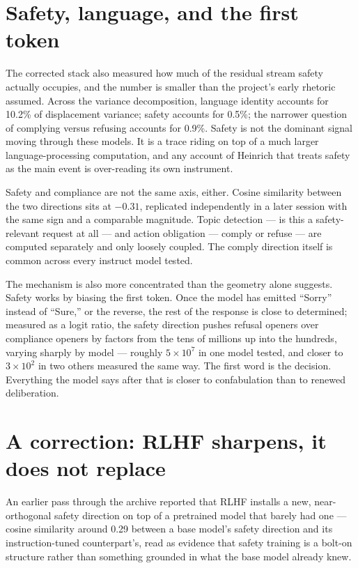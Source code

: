 \documentclass[11pt,oneside]{book}
\begin{document}
\section{Safety, language, and the first token}
The corrected stack also measured how much of the residual stream safety actually occupies, and the number is smaller than the project's early rhetoric assumed. Across the variance decomposition, language identity accounts for 10.2\% of displacement variance; safety accounts for 0.5\%; the narrower question of complying versus refusing accounts for 0.9\%. Safety is not the dominant signal moving through these models. It is a trace riding on top of a much larger language-processing computation, and any account of Heinrich that treats safety as the main event is over-reading its own instrument.

Safety and compliance are not the same axis, either. Cosine similarity between the two directions sits at $-0.31$, replicated independently in a later session with the same sign and a comparable magnitude. Topic detection --- is this a safety-relevant request at all --- and action obligation --- comply or refuse --- are computed separately and only loosely coupled. The comply direction itself is common across every instruct model tested.

The mechanism is also more concentrated than the geometry alone suggests. Safety works by biasing the first token. Once the model has emitted ``Sorry'' instead of ``Sure,'' or the reverse, the rest of the response is close to determined; measured as a logit ratio, the safety direction pushes refusal openers over compliance openers by factors from the tens of millions up into the hundreds, varying sharply by model --- roughly $5\times10^7$ in one model tested, and closer to $3\times10^2$ in two others measured the same way. The first word is the decision. Everything the model says after that is closer to confabulation than to renewed deliberation.

\section{A correction: RLHF sharpens, it does not replace}
An earlier pass through the archive reported that RLHF installs a new, near-orthogonal safety direction on top of a pretrained model that barely had one --- cosine similarity around 0.29 between a base model's safety direction and its instruction-tuned counterpart's, read as evidence that safety training is a bolt-on structure rather than something grounded in what the base model already knew.
\end{document}
